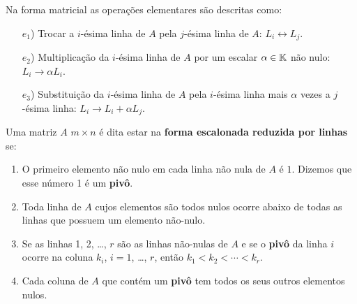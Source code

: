 \documentclass{beamer}
\begin{document}
    \begin{frame}
        Na forma matricial \pause as operações elementares são descritas como:\pause

        \vspace{.3cm}

        \begin{itemize}
            \item[$e_1$)] Trocar a $i$-ésima linha de $A$ \pause pela $j$-ésima linha de $A$: \pause $L_i \leftrightarrow L_j$.\pause

            \vspace{.3cm}

            \item[$e_2$)] Multiplicação da $i$-ésima linha de $A$ \pause por um escalar $\alpha \in \mathbb{K}$ não nulo: \pause $L_i \rightarrow \alpha L_i$.\pause

            \vspace{.3cm}

           \item[$e_3$)] Substituição da $i$-ésima linha de $A$ \pause pela $i$-ésima linha mais $\alpha$ vezes a $j$-ésima linha: \pause $L_i \rightarrow L_i + \alpha L_j$.
        \end{itemize}
    \end{frame}

    \begin{frame}
        \begin{definicao}\label{linhareduzida}
            Uma matriz $A$ $m \times n$ é \pause dita estar na \textbf{forma escalonada reduzida por linhas} se:\pause
            \begin{enumerate}[label={\roman*})]
                \item O primeiro elemento não nulo \pause em cada linha não nula de $A$ \pause é $1$. \pause Dizemos que esse número 1 é um \textbf{pivô}.\pause

                \vspace{.3cm}

                \item Toda linha de $A$ cujos elementos são todos nulos \pause ocorre abaixo de todas as linhas que possuem um elemento não-nulo.\pause

                \vspace{.3cm}

                \item Se as linhas 1, 2, \dots, $r$ são as linhas não-nulas de $A$ \pause e se o \textbf{pivô} da linha $i$ ocorre na coluna $k_i$, \pause $i = 1$, \dots, $r$, \pause então $k_1 < k_2 < \cdots < k_r$.\pause

                \vspace{.3cm}

                \item Cada coluna de $A$ que contém um \textbf{pivô} \pause tem todos os seus outros elementos nulos.
            \end{enumerate}
        \end{definicao}
    \end{frame}
\end{document}

